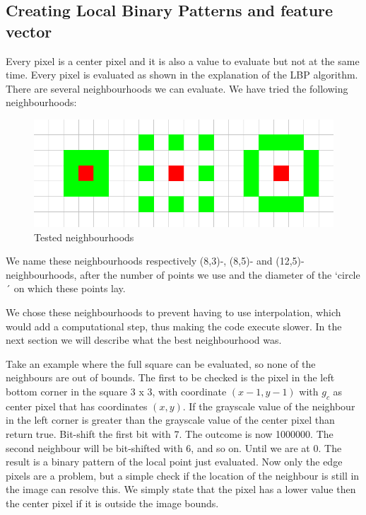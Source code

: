 \documentclass[a4paper]{article}
\begin{document}
\subsection{Creating Local Binary Patterns and feature vector}
Every pixel is a center pixel and it is also a value to evaluate but not at the
same time. Every pixel is evaluated as shown in the explanation
of the LBP algorithm. There are several neighbourhoods we can evaluate. We have
tried the following neighbourhoods:

\begin{figure}[H]
    \center
    \includegraphics[scale=0.5]{neighbourhoods.png}
    \caption{Tested neighbourhoods}
    \label{fig:tested-neighbourhoods}
\end{figure}

We name these neighbourhoods respectively (8,3)-, (8,5)- and
(12,5)-neighbourhoods, after the number of points we use and the diameter
of the `circle´ on which these points lay.

We chose these neighbourhoods to prevent having to use interpolation, which
would add a computational step, thus making the code execute slower. In the
next section we will describe what the best neighbourhood was.

Take an example where the full square can be evaluated, so none of the
neighbours are out of bounds. The first to be checked is the pixel in the left
bottom corner in the square 3 x 3, with coordinate $(x - 1, y - 1)$ with $g_c$
as center pixel that has coordinates $(x, y)$. If the grayscale value of the
neighbour in the left corner is greater than the grayscale
value of the center pixel than return true. Bit-shift the first bit with 7. The
outcome is now 1000000. The second neighbour will be bit-shifted with 6, and so
on. Until we are at 0. The result is a binary pattern of the local point just
evaluated.
Now only the edge pixels are a problem, but a simple check if the location of
the neighbour is still in the image can resolve this. We simply state that the
pixel has a lower value then the center pixel if it is outside the image
bounds.
\end{document}
